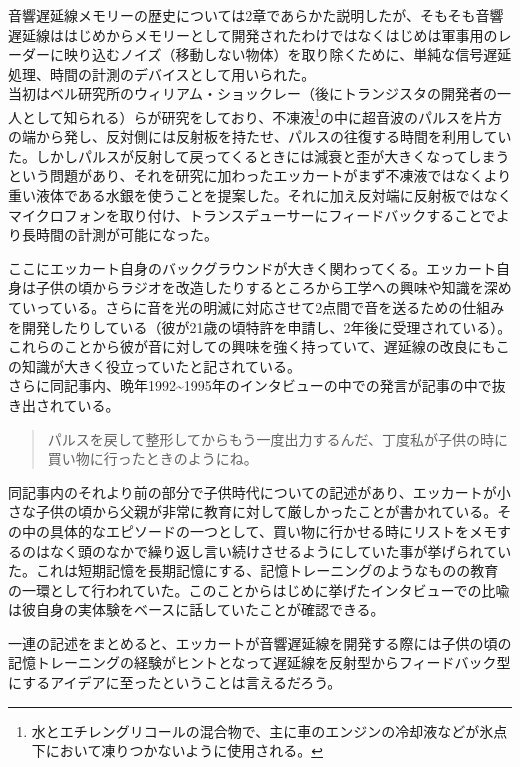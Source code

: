 \documentclass[a4paper,report]{jsbook}
\begin{document}
音響遅延線メモリーの歴史については2章であらかた説明したが、そもそも音響遅延線ははじめからメモリーとして開発されたわけではなくはじめは軍事用のレーダーに映り込むノイズ（移動しない物体）を取り除くために、単純な信号遅延処理、時間の計測のデバイスとして用いられた。\\
当初はベル研究所のウィリアム・ショックレー（後にトランジスタの開発者の一人として知られる）らが研究をしており、不凍液\footnote{水とエチレングリコールの混合物で、主に車のエンジンの冷却液などが氷点下において凍りつかないように使用される。}の中に超音波のパルスを片方の端から発し、反対側には反射板を持たせ、パルスの往復する時間を利用していた。しかしパルスが反射して戻ってくるときには減衰と歪が大きくなってしまうという問題があり、それを研究に加わったエッカートがまず不凍液ではなくより重い液体である水銀を使うことを提案した。それに加え反対端に反射板ではなくマイクロフォンを取り付け、トランスデューサーにフィードバックすることでより長時間の計測が可能になった。

ここにエッカート自身のバックグラウンドが大きく関わってくる。エッカート自身は子供の頃からラジオを改造したりするところから工学への興味や知識を深めていっている。さらに音を光の明滅に対応させて2点間で音を送るための仕組みを開発したりしている（彼が21歳の頃特許を申請し、2年後に受理されている\autocite{presper1942light}）。これらのことから彼が音に対しての興味を強く持っていて、遅延線の改良にもこの知識が大きく役立っていたと記されている。\\
さらに同記事内、晩年1992\textasciitilde{}1995年のインタビューの中での発言が記事の中で抜き出されている。

\begin{quote}
パルスを戻して整形してからもう一度出力するんだ、丁度私が子供の時に買い物に行ったときのようにね。
\end{quote}

同記事内のそれより前の部分で子供時代についての記述があり、エッカートが小さな子供の頃から父親が非常に教育に対して厳しかったことが書かれている。その中の具体的なエピソードの一つとして、買い物に行かせる時にリストをメモするのはなく頭のなかで繰り返し言い続けさせるようにしていた事が挙げられていた。これは短期記憶を長期記憶にする、記憶トレーニングのようなものの教育の一環として行われていた。このことからはじめに挙げたインタビューでの比喩は彼自身の実体験をベースに話していたことが確認できる。

一連の記述をまとめると、エッカートが音響遅延線を開発する際には子供の頃の記憶トレーニングの経験がヒントとなって遅延線を反射型からフィードバック型にするアイデアに至ったということは言えるだろう。
\end{document}
